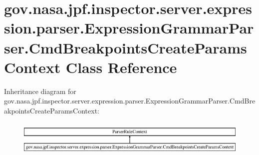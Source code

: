 \hypertarget{classgov_1_1nasa_1_1jpf_1_1inspector_1_1server_1_1expression_1_1parser_1_1_expression_grammar_pa40092569cc5b197b7a5caae27da04e05}{}\section{gov.\+nasa.\+jpf.\+inspector.\+server.\+expression.\+parser.\+Expression\+Grammar\+Parser.\+Cmd\+Breakpoints\+Create\+Params\+Context Class Reference}
\label{classgov_1_1nasa_1_1jpf_1_1inspector_1_1server_1_1expression_1_1parser_1_1_expression_grammar_pa40092569cc5b197b7a5caae27da04e05}
Inheritance diagram for gov.\+nasa.\+jpf.\+inspector.\+server.\+expression.\+parser.\+Expression\+Grammar\+Parser.\+Cmd\+Breakpoints\+Create\+Params\+Context\+:\begin{figure}[H]
\begin{center}
\leavevmode
\includegraphics[height=1.684211cm]{classgov_1_1nasa_1_1jpf_1_1inspector_1_1server_1_1expression_1_1parser_1_1_expression_grammar_pa40092569cc5b197b7a5caae27da04e05}
\end{center}
\end{figure}
